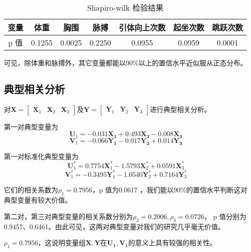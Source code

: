 \documentclass[withoutpreface]{cumcmthesis}
\begin{document}
\begin{table}[H]
    \centering
    \vspace{-0.6cm}
    \caption{Shapiro-wilk 检验结果}\label{Tab:2}
    \begin{tabular}{|c|c|c|c|c|c|c|}
        \hline
        变量  & 体重     & 胸围     & 脉搏     & 引体向上次数 & 起坐次数 & 跳跃次数 \\
        \hline
        p 值 & 0.1255 & 0.0025 & 0.2250 & 0.0955
            & 0.0959 & 0.0001                                 \\
        \hline
    \end{tabular}
\end{table}

\vspace{-0.4cm}
可见，除体重和脉搏外，其它变量都能以90\%以上的置信水平近似服从正态分布。

\vspace{-0.4cm}
\subsection{典型相关分析}
对$\mathbf{X}=\begin{bmatrix}
        \mathbf{X}_1 & \mathbf{X}_2 & \mathbf{X}_3
    \end{bmatrix}$及$\mathbf{Y}=\begin{bmatrix}
        \mathbf{Y}_1 & \mathbf{Y}_2 & \mathbf{Y}_3
    \end{bmatrix}$进行典型相关分析。
\vspace{0.2cm}

第一对典型变量为
$$\mathbf{U}_1=-0.031\mathbf{X_1}+
    0.493\mathbf{X_2}-0.008\mathbf{X_3}$$
$$\mathbf{V}_1=-0.066\mathbf{Y_1}-
    0.017\mathbf{Y_2}+0.014\mathbf{Y_3}$$

第一对标准化典型变量为
$$\mathbf{U}^*_1=0.7754 \mathbf{X}^*_1 -1.5793\mathbf{X}^*_2+0.0591  \mathbf{X}^*_3$$
$$\mathbf{V}^*_1=-0.3495\mathbf{Y}^*_1-1.0540 \mathbf{Y}^*_2+0.7164 \mathbf{Y}^*_3$$

它们的相关系数为$\rho_1=0.7956$，p 值为0.0617  ，我们能以90\%的置信水平判断这对典型变量有较大价值。

第二对，第三对典型变量的相关系数分别为$\rho_2=0.2006,\rho_3= 0.0726$， p 值分别为0.9457、0.6461。由此可见，这两对典型变量对我们的研究几乎毫无价值。

$\rho_1=0.7956$，这说明变量组$\mathbf{X},\mathbf{Y}$在$\mathbf{U_1},\mathbf{V_1}$的意义上具有较强的相关性。

\vspace{-0.4cm}
\end{document}
